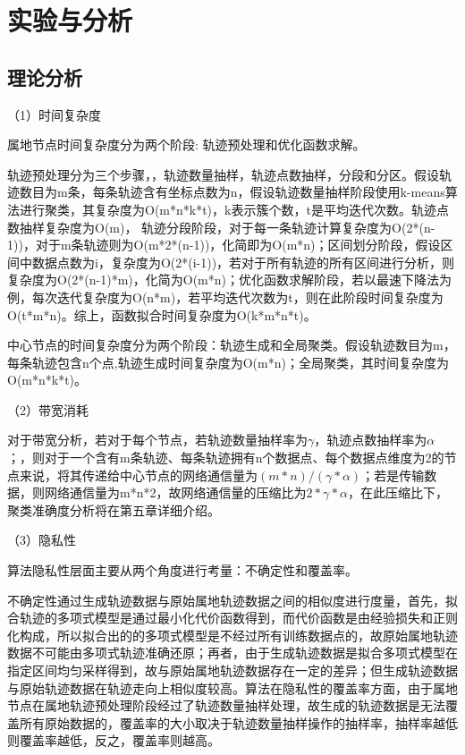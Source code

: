 \section{实验与分析}

\subsection{理论分析}

（1）时间复杂度

属地节点时间复杂度分为两个阶段: 轨迹预处理和优化函数求解。

轨迹预处理分为三个步骤，，轨迹数量抽样，轨迹点数抽样，分段和分区。假设轨迹数目为m条，每条轨迹含有坐标点数为n，假设轨迹数量抽样阶段使用k-means算法进行聚类，其复杂度为O(m*n*k*t)，k表示簇个数，t是平均迭代次数。轨迹点数抽样复杂度为O(m)，
轨迹分段阶段，对于每一条轨迹计算复杂度为O(2*(n-1))，对于m条轨迹则为O(m*2*(n-1))，化简即为O(m*n)；区间划分阶段，假设区间中数据点数为i，复杂度为O(2*(i-1))，若对于所有轨迹的所有区间进行分析，则复杂度为O(2*(n-1)*m)，化简为O(m*n)；优化函数求解阶段，若以最速下降法为例，每次迭代复杂度为O(n*m)，若平均迭代次数为t，则在此阶段时间复杂度为O(t*m*n)。综上，函数拟合时间复杂度为O(k*m*n*t)。

中心节点的时间复杂度分为两个阶段：轨迹生成和全局聚类。假设轨迹数目为m，每条轨迹包含n个点,轨迹生成时间复杂度为O(m*n)；全局聚类，其时间复杂度为O(m*n*k*t)。

（2）带宽消耗

对于带宽分析，若对于每个节点，若轨迹数量抽样率为$\gamma$，轨迹点数抽样率为$\alpha$；，则对于一个含有m条轨迹、每条轨迹拥有n个数据点、每个数据点维度为2的节点来说，将其传递给中心节点的网络通信量为$(m*n)/(\gamma*\alpha)$；若是传输数据，则网络通信量为m*n*2，故网络通信量的压缩比为$2*\gamma*\alpha$，在此压缩比下，聚类准确度分析将在第五章详细介绍。

（3）隐私性

算法隐私性层面主要从两个角度进行考量：不确定性和覆盖率。

不确定性通过生成轨迹数据与原始属地轨迹数据之间的相似度进行度量，首先，拟合轨迹的多项式模型是通过最小化代价函数得到，而代价函数是由经验损失和正则化构成，所以拟合出的的多项式模型是不经过所有训练数据点的，故原始属地轨迹数据不可能由多项式轨迹准确还原；再者，由于生成轨迹数据是拟合多项式模型在指定区间均匀采样得到，故与原始属地轨迹数据存在一定的差异；但生成轨迹数据与原始轨迹数据在轨迹走向上相似度较高。算法在隐私性的覆盖率方面，由于属地节点在属地轨迹预处理阶段经过了轨迹数量抽样处理，故生成的轨迹数据是无法覆盖所有原始数据的，覆盖率的大小取决于轨迹数量抽样操作的抽样率，抽样率越低则覆盖率越低，反之，覆盖率则越高。

